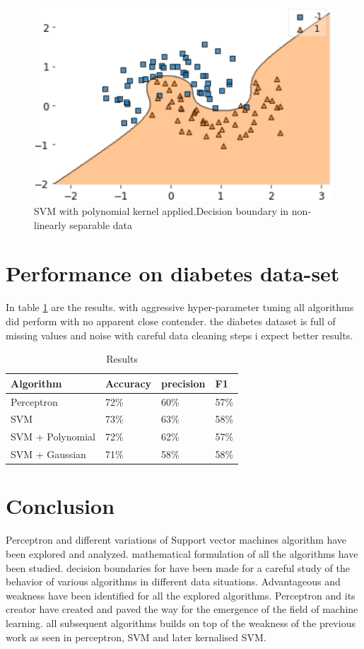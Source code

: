 \documentclass[10pt,twocolumn,letterpaper]{article}
\begin{document}
\begin{figure}[htb]
  \includegraphics[width=\linewidth]{svm_k_non.png}
  \caption{SVM with polynomial kernel applied.Decision boundary in non-linearly separable data}
  \label{fig:svm_exp_k}
\end{figure}


\section{Performance on diabetes data-set}
In table \ref{tab:res} are the results. with aggressive hyper-parameter tuning all algorithms did perform with no apparent close contender. the diabetes dataset is full of missing values and noise with careful data cleaning steps i expect better results. 

\begin{table}[htb]
\centering
\begin{tabular}{|l|l|l|l|} 
\toprule
Algorithm         & Accuracy & precision & F1    \\ 
\hline
Perceptron        & 72\%     & 60\%      & 57\%  \\ 
\hline
SVM               & 73\%     & 63\%      & 58\%  \\ 
\hline
SVM + Polynomial  & 72\%     & 62\%      & 57\%  \\ 
\hline
SVM + Gaussian    & 71\%     & 58\%      & 58\%  \\
\bottomrule
\end{tabular}
\caption{Results}
\label{tab:res}
\end{table}

\section{Conclusion}
Perceptron and different variations of Support vector machines algorithm have been explored and analyzed. mathematical formulation of all the algorithms have been studied. decision boundaries for have been made for a careful study of the behavior of various algorithms in different data situations. Advantageous and weakness have been identified for all the explored algorithms. Perceptron and its creator have created and paved the way for the emergence of the field of machine learning. all subsequent algorithms builds on top of the weakness of the previous work as seen in perceptron, SVM and later kernalised SVM.


 

\end{document}
